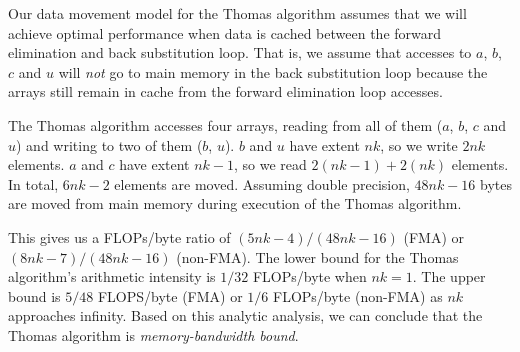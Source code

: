 \documentclass{sig-alternate-05-2015}
\begin{document}
Our data movement model for the Thomas algorithm assumes that we will achieve
  optimal performance when data is cached between the forward elimination and
  back substitution loop.
That is, we assume that accesses to \(a\), \(b\), \(c\) and \(u\) will
  \emph{not} go to main memory in the back substitution loop because the arrays
  still remain in cache from the forward elimination loop accesses.

The Thomas algorithm accesses four arrays, reading from all of them (\(a\),
  \(b\), \(c\) and \(u\)) and writing to two of them (\(b\), \(u\)).
\(b\) and \(u\) have extent \(nk\), so we write \(2nk\) elements.
\(a\) and \(c\) have extent \(nk-1\), so we read \(2(nk-1)+2(nk)\) elements.
In total, \(6nk-2\) elements are moved.
Assuming double precision, \(48nk-16\) bytes are moved from main memory
  during execution of the Thomas algorithm.

This gives us a FLOPs/byte ratio of \((5nk-4)/(48nk-16)\) (FMA) or
  \((8nk-7)/(48nk-16)\) (non-FMA).
The lower bound for the Thomas algorithm's arithmetic intensity is \(1/32\)
  FLOPs/byte when \(nk=1\). 
The upper bound is \(5/48\) FLOPS/byte (FMA) or \(1/6\) FLOPs/byte (non-FMA) as
  \(nk\) approaches infinity.
Based on this analytic analysis, we can conclude that the Thomas algorithm is
\emph{memory-bandwidth bound}.
\end{document}

